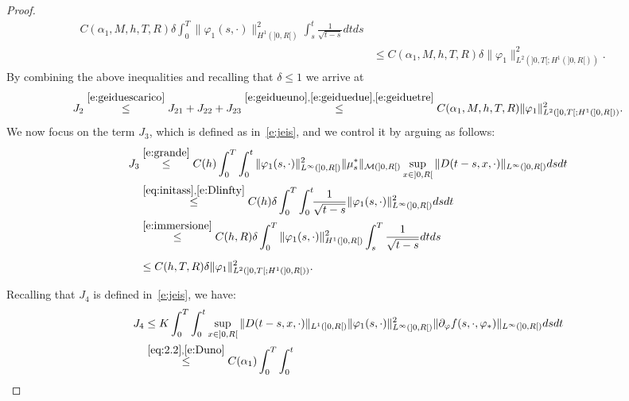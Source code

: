 \documentclass[11pt,leqno]{amsart}
\numberwithin{equation}{section}
\begin{document}
\begin{proof}
\begin{equation}
\begin{split}
  C(\alpha_1, M,h, T, R) \delta 
   \int_0^T
   \| {\varphi}_1  (s, \cdot)  \|^2_{H^1(]0, R[)}   
  \int_s^t \frac{1}{\sqrt{t-s}} 
    dt
  ds \\ & \leq 
  C(\alpha_1, M, h,T, R) \delta \| {\varphi}_1 \|^2_{L^2 (]0, T[ ;H^1 (]0, R[ ))}. \phantom{\int} 
\end{split}
\end{equation}
By combining the above inequalities and recalling that $\delta\leq 1$
we arrive at
\begin{equation}
\label{e:geidue2}
   J_2 \stackrel{\eqref{e:geiduescarico}}{\le}
   J_{21}+J_{22}+J_{23} \stackrel{\eqref{e:geidueuno},\eqref{e:geiduedue},\eqref{e:geiduetre}}{\leq}
    C(\alpha_1, M,h, T, R)  \| {\varphi}_1 \|^2_{L^2 (]0, T[ ;H^1 (]0, R[ ))}.   
\end{equation}
We now focus on the term $J_3$, which is defined as in~\eqref{e:jeis}, and we control it by arguing as follows: 
\begin{equation}
  \label{e:geitre}
  \begin{split}
    J_3 & \stackrel{\eqref{e:grande}}{\leq} C(h) \int_0^T \int_0^t \| {\varphi}_1
    (s, \cdot) \|^2_{L^\infty(]0, R[)} \|\mu^\ast_s \|_{\mathcal M
      (]0, R[)} \sup_{x \in ]0, R[} \| D(t-s, x, \cdot)
    \|_{L^\infty(]0, R[)} ds dt 
    \\
    &
    \stackrel{\eqref{eq:initass},\eqref{e:Dlinfty}}{\leq} C(h) \delta
    \int_0^T \int_0^t \! \! \frac{1}{\sqrt{t-s}} \| {\varphi}_1 (s, \cdot)
    \|^2_{L^\infty(]0, R[)} ds dt 
    \\
    &
    \stackrel{\eqref{e:immersione}}{\leq} C(h, R) \delta \int_0^T \|
    {\varphi}_1 (s, \cdot) \|^2_{H^1(]0, R[)} \int_s^T \frac{1}{\sqrt{t-s}}
    dt ds
    \\
    & \leq C(h, T, R) \delta \| {\varphi}_1 \|^2_{L^2 (]0, T[ ;H^1 (]0, R[
      ))}. \phantom{\int}
  \end{split}
\end{equation}
Recalling that $J_4$ is defined in~\eqref{e:jeis}, we have:
\begin{equation}
\label{e:geiquattro}
\begin{split}
   J_4 & \leq K
   \int_0^T
  \int_0^t   \sup_{x \in ]0, R[}      
  \| D(t-s, x, \cdot) \|_{L^1(]0, R[)}
  \| {\varphi}_1  (s, \cdot) \|^2_{L^\infty(]0, R[)} 
  \| \partial_{\varphi} f(s, \cdot, {\varphi}_\ast) 
  \|_{L^\infty (]0, R[)}
   ds 
  dt \\ &
  \stackrel{\eqref{eq:2.2},\eqref{e:Duno}}{\leq}
  C(\alpha_1) \int_0^T 
  \int_0^t  \! \!     

\end{split}
\end{equation}
\end{proof}
\end{document}
